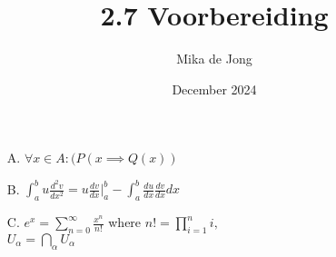\documentclass{article}
\title{2.7 Voorbereiding}
\author{Mika de Jong}
\date{December 2024}
\begin{document}
\maketitle

\begin{enumerate}
    \item[A.] $\forall x \in A : (P(x \implies Q(x))$
    \item[B.] ${\displaystyle\int}^b_au\frac{d^2v}{dx^2}=u\frac{dv}{dx}{\bigg|}^b_a-\int^b_a\frac{du}{dx}\frac{dv}{dx}dx$
    \item[C.] $e^x={\displaystyle\sum^{\infty}_{n=0}\frac{x^n}{n!}}$ where $n!={\displaystyle \prod^{n}_{i=1}i},$\\
              $U_\alpha={\displaystyle \bigcap_\alpha U_\alpha}$
\end{enumerate}
\end{document}
